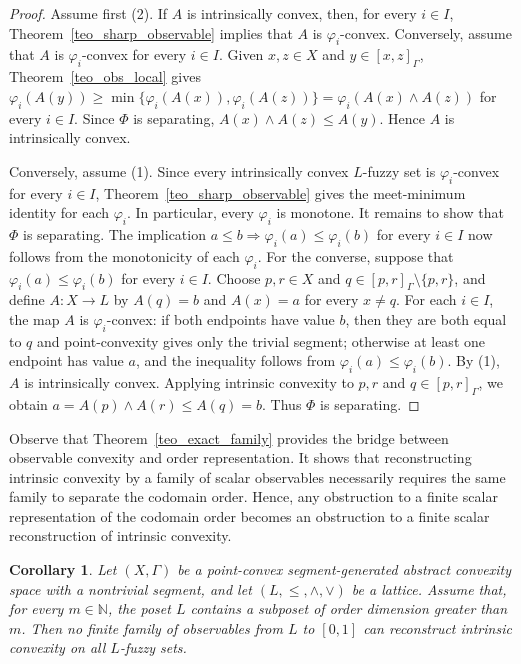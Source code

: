 \documentclass[11pt,a4paper]{article}
\newtheorem{corollary}{Corollary}
\begin{document}
\begin{proof}
Assume first (2). If \(A\) is intrinsically convex, then, for every \(i\in I\), Theorem~\ref{teo_sharp_observable} implies that \(A\) is \(\varphi_i\)-convex. Conversely, assume that \(A\) is \(\varphi_i\)-convex for every \(i\in I\). Given \(x,z\in X\) and \(y\in[x,z]_{\Gamma}\), Theorem~\ref{teo_obs_local} gives \(\varphi_i(A(y))\geq \min\{\varphi_i(A(x)),\varphi_i(A(z))\}=\varphi_i(A(x)\wedge A(z))\) for every \(i\in I\). Since \(\Phi\) is separating, \(A(x)\wedge A(z)\leq A(y)\). Hence \(A\) is intrinsically convex.

Conversely, assume (1). Since every intrinsically convex \(L\)-fuzzy set is \(\varphi_i\)-convex for every \(i\in I\), Theorem~\ref{teo_sharp_observable} gives the meet-minimum identity for each \(\varphi_i\). In particular, every \(\varphi_i\) is monotone. It remains to show that \(\Phi\) is separating. The implication \(a\leq b\Rightarrow \varphi_i(a)\leq\varphi_i(b)\) for every \(i\in I\) now follows from the monotonicity of each \(\varphi_i\). For the converse, suppose that \(\varphi_i(a)\leq\varphi_i(b)\) for every \(i\in I\). Choose \(p,r\in X\) and \(q\in[p,r]_{\Gamma}\setminus\{p,r\}\), and define \(A:X\to L\) by \(A(q)=b\) and \(A(x)=a\) for every \(x\neq q\). For each \(i\in I\), the map \(A\) is \(\varphi_i\)-convex: if both endpoints have value \(b\), then they are both equal to \(q\) and point-convexity gives only the trivial segment; otherwise at least one endpoint has value \(a\), and the inequality follows from \(\varphi_i(a)\leq\varphi_i(b)\). By (1), \(A\) is intrinsically convex. Applying intrinsic convexity to \(p,r\) and \(q\in[p,r]_{\Gamma}\), we obtain \(a=A(p)\wedge A(r)\leq A(q)=b\). Thus \(\Phi\) is separating.
\end{proof}


Observe that Theorem~\ref{teo_exact_family} provides the bridge between observable convexity and order representation. It shows that reconstructing intrinsic convexity by a family of scalar observables necessarily requires the same family to separate the codomain order. Hence, any obstruction to a finite scalar representation of the codomain order becomes an obstruction to a finite scalar reconstruction of intrinsic convexity.




\begin{corollary}\label{cor_dimension_obstruction}
Let \((X,\Gamma)\) be a point-convex segment-generated abstract convexity space with a nontrivial segment, and let \((L,\leq,\wedge,\vee)\) be a lattice. Assume that, for every \(m\in\mathbb N\), the poset \(L\) contains a subposet of order dimension greater than \(m\). Then no finite family of observables from \(L\) to \([0,1]\) can reconstruct intrinsic convexity on all \(L\)-fuzzy sets.
\end{corollary}
\end{document}
